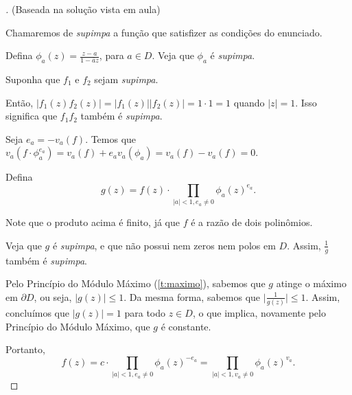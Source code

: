 \begin{proof}[] (Baseada na solução vista em aula)

Chamaremos de \textit{supimpa} a função que satisfizer as condições do enunciado.

Defina $\phi_a(z)=\frac{z-a}{1-\overline{a}z}$, para $a \in D$. Veja que $\phi_a$ é \textit{supimpa}.

Suponha que $f_1$ e $f_2$ sejam \textit{supimpa}.

Então, $\lvert f_1(z)f_2(z)\rvert=\lvert f_1(z)\rvert\lvert f_2(z)\rvert=1\cdot 1=1$ quando $\lvert z\rvert =1$. Isso significa que $f_1f_2$ também é \textit{supimpa}.

Seja $e_a=-v_a(f)$. Temos que $v_a(f\cdot \phi_a^{e_a})=v_a(f)+e_av_a(\phi_a)=v_a(f)-v_a(f)=0$.

Defina $$g(z)=f(z)\cdot \prod_{\lvert a \rvert < 1, e_a\neq 0}\phi_a(z)^{e_a}.$$

Note que o produto acima é finito, já que $f$ é a razão de dois polinômios.

Veja que $g$ é \textit{supimpa}, e que não possui nem zeros nem polos em $D$. Assim, $\frac{1}{g}$ também é \textit{supimpa}.

Pelo Princípio do Módulo Máximo (\cref{t:maximo}), sabemos que $g$ atinge o máximo em $\partial D$, ou seja, $\lvert g(z) \rvert\leq 1$. Da mesma forma, sabemos que $\lvert \frac{1}{g(z)} \rvert \leq 1$. Assim, concluímos que $\lvert g(z) \rvert = 1$ para todo $z\in D$, o que implica, novamente pelo Princípio do Módulo Máximo, que $g$ é constante.

Portanto, $$f(z)= c\cdot \prod_{\lvert a \rvert < 1, e_a\neq 0}\phi_a(z)^{-e_a}=\prod_{\lvert a \rvert < 1, v_a\neq 0}\phi_a(z)^{v_a}.$$
\end{proof}
